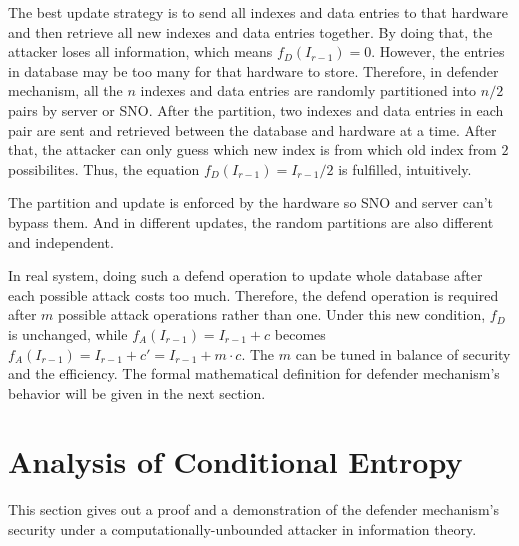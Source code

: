 \documentclass[10pt, conference, compsocconf]{IEEEtran}
\begin{document}
        The best update strategy
        is to send all indexes and data entries to that hardware and then
        retrieve all new indexes and data entries together. By doing that, the attacker
        loses all information, which means $f_D(I_{r-1}) = 0$. However, the entries
        in database may be too many for that hardware to store. Therefore, in defender mechanism,
        all the $n$ indexes and data entries are randomly partitioned into
        $n/2$ pairs by server or SNO.
        After the partition,
        two indexes and data entries in each pair are sent and retrieved
        between the database and hardware at a time. After that, the attacker can
        only guess which new index is from which old index from $2$ possibilites.
        Thus, the equation $f_D(I_{r-1}) = I_{r-1}/2$ is fulfilled, intuitively.

        The partition and update is enforced by the hardware so SNO
        and server can't bypass them. And in
        different updates, the random partitions are also different
        and independent.


        In real system, doing such a defend operation to update whole
        database after each possible attack costs too much.
        Therefore, the defend operation is required after $m$
        possible attack operations rather than one. Under this
        new condition, $f_D$ is unchanged, while $f_A(I_{r-1}) = I_{r-1}+c$
        becomes $f_A(I_{r-1}) = I_{r-1}+c' = I_{r-1}+m \cdot c$.
        The $m$ can be tuned in balance of security and the
        efficiency. The formal mathematical definition for
        defender mechanism's behavior will be given in the
        next section.

\section{Analysis of Conditional Entropy}\label{sec_proof}
    This section gives out a proof 
    and a demonstration
    of the defender mechanism's security under a computationally-unbounded attacker
    in information theory.
\end{document}
